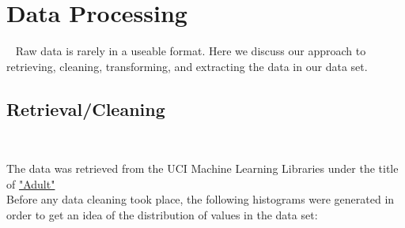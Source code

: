 \documentclass{article}
\begin{document}
	\section{Data Processing}~
		Raw data is rarely in a useable format. Here we discuss our approach to retrieving, cleaning, transforming, and extracting the data in our data set.
		\subsection{Retrieval/Cleaning}~
		
		The data was retrieved from the UCI	Machine Learning Libraries under the title of \href{https://archive.ics.uci.edu/ml/datasets/Adult}{"Adult"}\\
		
		Before any data cleaning took place, the following histograms were generated in order to get an idea of the distribution of values in the data set:
		
\end{document}
